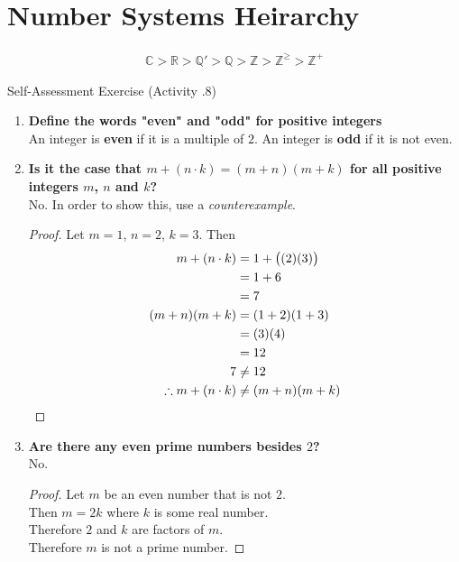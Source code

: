 \documentclass[../notes.tex]{subfiles}
\begin{document}
		\section{Number Systems Heirarchy}
			\begin{align*}
				\mathbb{C} > \mathbb{R} > \mathbb{Q}' > \mathbb{Q} > \mathbb{Z} > \mathbb{Z}^{\geq} > \mathbb{Z}^{+}
			\end{align*}
			\pagebreak
			\begin{exercisebox}{Self-Assessment Exercise (Activity \thechapter.8)}
				\begin{enumerate}
					\item \textbf{Define the words "even" and "odd" for positive integers}\\
						An integer is \textbf{even} if it is a multiple of $2$. An integer is \textbf{odd} if it is not even.
					\item \textbf{Is it the case that $m + (n\cdot k) = (m + n)(m + k)$ for all positive integers $m$, $n$ and $k$?}\\
						No. In order to show this, use a \textit{counterexample}. \rule{0pt}{11pt} \vspace*{-18pt}
						\begin{proof}
							Let $m = 1$, $n = 2$, $k = 3$. Then
							\begin{align*}
								m + (n \cdot k) &= 1 + \bigl((2)(3)\bigr)\\
								&= 1 + 6\\
								&= 7\\
								(m + n)(m + k) &= (1 + 2)(1 + 3)\\
								&= (3)(4)\\
								&= 12\\
								7 &\neq 12\\
								\therefore m + (n \cdot k) &\neq (m + n)(m + k) \qedhere
							\end{align*}
						\end{proof}
					\item \textbf{Are there any even prime numbers besides $2$?}\\
					No. \rule{0pt}{11pt} \vspace*{-18pt}
					\begin{proof}
						Let $m$ be an even number that is not $2$.\\
						Then $m = 2k$ where $k$ is some real number.\\
						Therefore $2$ and $k$ are factors of $m$.\\
						Therefore $m$ is not a prime number.

\end{proof}
\end{enumerate}
\end{exercisebox}
\end{document}
